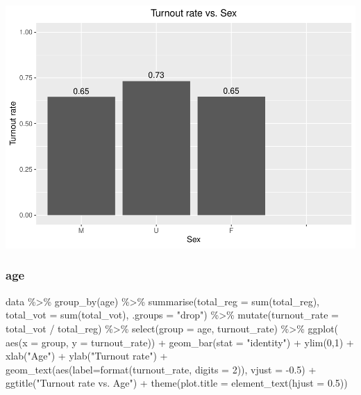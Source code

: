 \documentclass[
]{article}
\newenvironment{Shaded}{\begin{snugshade}}{\end{snugshade}}
\newcommand{\AttributeTok}[1]{\textcolor[rgb]{0.77,0.63,0.00}{#1}}
\newcommand{\DecValTok}[1]{\textcolor[rgb]{0.00,0.00,0.81}{#1}}
\newcommand{\FloatTok}[1]{\textcolor[rgb]{0.00,0.00,0.81}{#1}}
\newcommand{\FunctionTok}[1]{\textcolor[rgb]{0.00,0.00,0.00}{#1}}
\newcommand{\NormalTok}[1]{#1}
\newcommand{\SpecialCharTok}[1]{\textcolor[rgb]{0.00,0.00,0.00}{#1}}
\newcommand{\StringTok}[1]{\textcolor[rgb]{0.31,0.60,0.02}{#1}}
\begin{document}
\includegraphics{CS2_files/figure-latex/unnamed-chunk-12-1.pdf}

\hypertarget{age}{%
\subsubsection{age}\label{age}}

\begin{Shaded}
\begin{Highlighting}[]
\NormalTok{data }\SpecialCharTok{\%\textgreater{}\%}
  \FunctionTok{group\_by}\NormalTok{(age) }\SpecialCharTok{\%\textgreater{}\%}
  \FunctionTok{summarise}\NormalTok{(}\AttributeTok{total\_reg =} \FunctionTok{sum}\NormalTok{(total\_reg),}
            \AttributeTok{total\_vot =} \FunctionTok{sum}\NormalTok{(total\_vot), }\AttributeTok{.groups =} \StringTok{"drop"}\NormalTok{) }\SpecialCharTok{\%\textgreater{}\%}
  \FunctionTok{mutate}\NormalTok{(}\AttributeTok{turnout\_rate =}\NormalTok{ total\_vot }\SpecialCharTok{/}\NormalTok{ total\_reg) }\SpecialCharTok{\%\textgreater{}\%}
  \FunctionTok{select}\NormalTok{(}\AttributeTok{group =}\NormalTok{ age, turnout\_rate) }\SpecialCharTok{\%\textgreater{}\%}
  \FunctionTok{ggplot}\NormalTok{( }\FunctionTok{aes}\NormalTok{(}\AttributeTok{x =}\NormalTok{ group, }\AttributeTok{y =}\NormalTok{ turnout\_rate)) }\SpecialCharTok{+}
  \FunctionTok{geom\_bar}\NormalTok{(}\AttributeTok{stat =} \StringTok{"identity"}\NormalTok{) }\SpecialCharTok{+}
  \FunctionTok{ylim}\NormalTok{(}\DecValTok{0}\NormalTok{,}\DecValTok{1}\NormalTok{) }\SpecialCharTok{+}
  \FunctionTok{xlab}\NormalTok{(}\StringTok{"Age"}\NormalTok{) }\SpecialCharTok{+} \FunctionTok{ylab}\NormalTok{(}\StringTok{"Turnout rate"}\NormalTok{) }\SpecialCharTok{+}
  \FunctionTok{geom\_text}\NormalTok{(}\FunctionTok{aes}\NormalTok{(}\AttributeTok{label=}\FunctionTok{format}\NormalTok{(turnout\_rate, }\AttributeTok{digits =} \DecValTok{2}\NormalTok{)), }\AttributeTok{vjust =} \SpecialCharTok{{-}}\FloatTok{0.5}\NormalTok{) }\SpecialCharTok{+}
  \FunctionTok{ggtitle}\NormalTok{(}\StringTok{"Turnout rate vs. Age"}\NormalTok{) }\SpecialCharTok{+}
    \FunctionTok{theme}\NormalTok{(}\AttributeTok{plot.title =} \FunctionTok{element\_text}\NormalTok{(}\AttributeTok{hjust =} \FloatTok{0.5}\NormalTok{))}
\end{Highlighting}
\end{Shaded}
\end{document}
